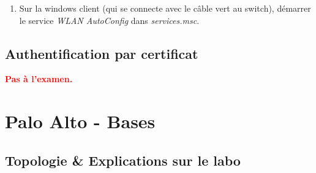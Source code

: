 \documentclass[a4paper]{article}
\begin{document}
\begin{enumerate}
\item Sur la windows client (qui se connecte avec le câble vert au switch), démarrer le service \textit{WLAN AutoConfig} dans \textit{services.msc}.

\end{enumerate}










\subsection{Authentification par certificat}





\textcolor{red}{\textbf{Pas à l'examen.}}















\newpage \section{Palo Alto - Bases}










\subsection{Topologie \& Explications sur le labo}
\end{document}
